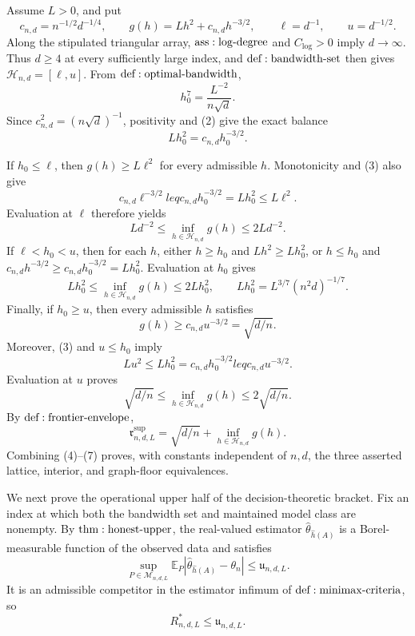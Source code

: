 Assume \(L>0\), and put
\[
 c_{n,d}=n^{-1/2}d^{-1/4},\qquad
 g(h)=Lh^2+c_{n,d}h^{-3/2},\qquad
 \ell=d^{-1},\qquad u=d^{-1/2}.
\tag{1}
\]
Along the stipulated triangular array, \({\rm ass:log\text{-}degree}\) and \(C_{\log}>0\) imply \(d\to\infty\).  Thus \(d\geq4\) at every sufficiently large index, and \({\rm def:bandwidth\text{-}set}\) then gives \(\mathcal H_{n,d}=[\ell,u]\).  From \({\rm def:optimal\text{-}bandwidth}\),
\[
 h_0^7=\frac{L^{-2}}{n\sqrt d}.
\tag{2}
\]
Since \(c_{n,d}^2=(n\sqrt d)^{-1}\), positivity and (2) give the exact balance
\[
 Lh_0^2=c_{n,d}h_0^{-3/2}.
\tag{3}
\]

If \(h_0\leq\ell\), then \(g(h)\geq L\ell^2\) for every admissible \(h\).  Monotonicity and (3) also give
\[
 c_{n,d}\ell^{-3/2}leq c_{n,d}h_0^{-3/2}
 =Lh_0^2\leq L\ell^2.
\]
Evaluation at \(\ell\) therefore yields
\[
 Ld^{-2}\leq\inf_{h\in\mathcal H_{n,d}}g(h)\leq2Ld^{-2}.
\tag{4}
\]
If \(\ell<h_0<u\), then for each \(h\), either \(h\geq h_0\) and \(Lh^2\geq Lh_0^2\), or \(h\leq h_0\) and \(c_{n,d}h^{-3/2}\geq c_{n,d}h_0^{-3/2}=Lh_0^2\).  Evaluation at \(h_0\) gives
\[
 Lh_0^2\leq\inf_{h\in\mathcal H_{n,d}}g(h)\leq2Lh_0^2,
 \qquad
 Lh_0^2=L^{3/7}(n^2d)^{-1/7}.
\tag{5}
\]
Finally, if \(h_0\geq u\), then every admissible \(h\) satisfies
\[
 g(h)\geq c_{n,d}u^{-3/2}=\sqrt{d/n}.
\]
Moreover, (3) and \(u\leq h_0\) imply
\[
 Lu^2\leq Lh_0^2=c_{n,d}h_0^{-3/2}leq c_{n,d}u^{-3/2}.
\]
Evaluation at \(u\) proves
\[
 \sqrt{d/n}\leq\inf_{h\in\mathcal H_{n,d}}g(h)
 \leq2\sqrt{d/n}.
\tag{6}
\]
By \({\rm def:frontier\text{-}envelope}\),
\[
 \mathfrak r^{\mathrm{sup}}_{n,d,L}
 =\sqrt{d/n}+\inf_{h\in\mathcal H_{n,d}}g(h).
\tag{7}
\]
Combining (4)--(7) proves, with constants independent of \(n,d\), the three asserted lattice, interior, and graph-floor equivalences.

We next prove the operational upper half of the decision-theoretic bracket.  Fix an index at which both the bandwidth set and maintained model class are nonempty.  By \({\rm thm:honest\text{-}upper}\), the real-valued estimator \(\widehat\theta_{\widehat h(A)}\) is a Borel-measurable function of the observed data and satisfies
\[
 \sup_{P\in\mathcal M_{n,d,L}}
 \mathbb E_P|\widehat\theta_{\widehat h(A)}-\theta_n|
 \leq\mathfrak u_{n,d,L}.
\tag{8}
\]
It is an admissible competitor in the estimator infimum of \({\rm def:minimax\text{-}criteria}\), so
\[
 R^*_{n,d,L}\leq\mathfrak u_{n,d,L}.
\tag{9}
\]

